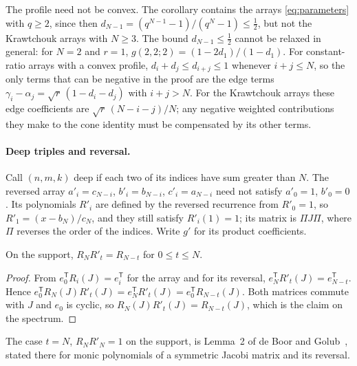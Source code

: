 The profile need not be convex. The corollary contains the arrays \eqref{eq:parameters} with $q\geq2$, since then $d_{N-1}=(q^{N-1}-1)/(q^N-1)\leq\tfrac12$, but not the Krawtchouk arrays with $N\geq3$. The bound $d_{N-1}\leq\tfrac12$ cannot be relaxed in general: for $N=2$ and $r=1$, $g(2,2;2)=(1-2d_1)/(1-d_1)$. For constant-ratio arrays with a convex profile, $d_i+d_j\leq d_{i+j}\leq1$ whenever $i+j\leq N$, so the only terms that can be negative in the proof are the edge terms $\gamma_i-\alpha_j=\sqrt r\,(1-d_i-d_j)$ with $i+j>N$. For the Krawtchouk arrays these edge coefficients are $\sqrt r\,(N-i-j)/N$; any negative weighted contributions they make to the cone identity must be compensated by its other terms.

\paragraph{Deep triples and reversal.}
Call $(n,m,k)$ deep if each two of its indices have sum greater than $N$. The reversed array $a'_i=c_{N-i}$, $b'_i=b_{N-i}$, $c'_i=a_{N-i}$ need not satisfy $a'_0=1$, $b'_0=0$. Its polynomials $R'_i$ are defined by the reversed recurrence from $R'_0=1$, so $R'_1=(x-b_N)/c_N$, and they still satisfy $R'_i(1)=1$; its matrix is $\Pi J\Pi$, where $\Pi$ reverses the order of the indices. Write $g'$ for its product coefficients.

\begin{lemma}\label{lem:reversal}
On the support, $R_NR'_t=R_{N-t}$ for $0\leq t\leq N$.
\end{lemma}
\begin{proof}
From $e_0^{\mathsf T}R_i(J)=e_i^{\mathsf T}$ for the array and for its reversal, $e_N^{\mathsf T}R'_t(J)=e_{N-t}^{\mathsf T}$. Hence $e_0^{\mathsf T}R_N(J)R'_t(J)=e_N^{\mathsf T}R'_t(J)=e_0^{\mathsf T}R_{N-t}(J)$. Both matrices commute with $J$ and $e_0$ is cyclic, so $R_N(J)R'_t(J)=R_{N-t}(J)$, which is the claim on the spectrum.
\end{proof}
The case $t=N$, $R_NR'_N=1$ on the support, is Lemma~2 of de Boor and Golub~\cite{deboor}, stated there for monic polynomials of a symmetric Jacobi matrix and its reversal.

